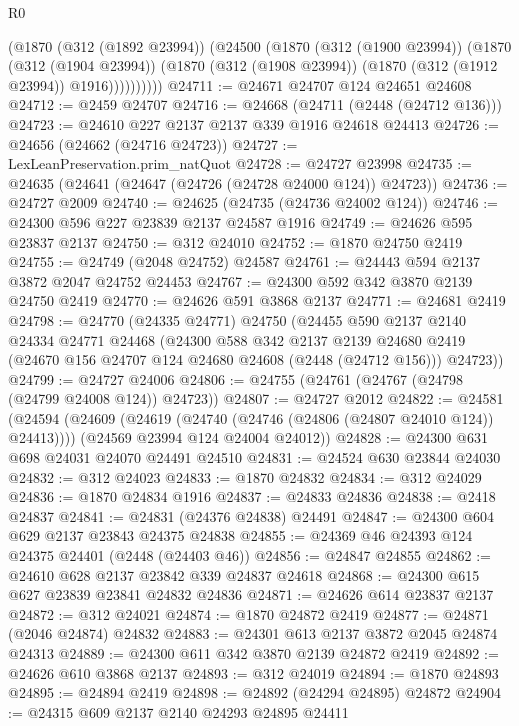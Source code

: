 \begin{lexlean}{R0}
\begin{coremodule}
            (@1870
              (@312 (@1892 @23994))
              (@24500
                (@1870
                  (@312 (@1900 @23994))
                  (@1870
                    (@312 (@1904 @23994))
                    (@1870 (@312 (@1908 @23994)) (@1870 (@312 (@1912 @23994)) @1916))))))))))
@24711 := @24671 @24707 @124 @24651 @24608
@24712 := @2459 @24707
@24716 := @24668 (@24711 (@2448 (@24712 @136)))
@24723 := @24610 @227 @2137 @2137 @339 @1916 @24618 @24413
@24726 := @24656 (@24662 (@24716 @24723))
@24727 := LexLeanPreservation.prim_natQuot
@24728 := @24727 @23998
@24735 := @24635 (@24641 (@24647 (@24726 (@24728 @24000 @124)) @24723))
@24736 := @24727 @2009
@24740 := @24625 (@24735 (@24736 @24002 @124))
@24746 := @24300 @596 @227 @23839 @2137 @24587 @1916
@24749 := @24626 @595 @23837 @2137
@24750 := @312 @24010
@24752 := @1870 @24750 @2419
@24755 := @24749 (@2048 @24752) @24587
@24761 := @24443 @594 @2137 @3872 @2047 @24752 @24453
@24767 := @24300 @592 @342 @3870 @2139 @24750 @2419
@24770 := @24626 @591 @3868 @2137
@24771 := @24681 @2419
@24798 := @24770
    (@24335 @24771)
    @24750
    (@24455
      @590
      @2137
      @2140
      @24334
      @24771
      @24468
      (@24300
        @588
        @342
        @2137
        @2139
        @24680
        @2419
        (@24670 @156 @24707 @124 @24680 @24608 (@2448 (@24712 @156)))
        @24723))
@24799 := @24727 @24006
@24806 := @24755 (@24761 (@24767 (@24798 (@24799 @24008 @124)) @24723))
@24807 := @24727 @2012
@24822 := @24581
    (@24594
      (@24609 (@24619 (@24740 (@24746 (@24806 (@24807 @24010 @124)) @24413))))
      (@24569 @23994 @124 @24004 @24012))
@24828 := @24300 @631 @698 @24031 @24070 @24491 @24510
@24831 := @24524 @630 @23844 @24030
@24832 := @312 @24023
@24833 := @1870 @24832
@24834 := @312 @24029
@24836 := @1870 @24834 @1916
@24837 := @24833 @24836
@24838 := @2418 @24837
@24841 := @24831 (@24376 @24838) @24491
@24847 := @24300 @604 @629 @2137 @23843 @24375 @24838
@24855 := @24369 @46 @24393 @124 @24375 @24401 (@2448 (@24403 @46))
@24856 := @24847 @24855
@24862 := @24610 @628 @2137 @23842 @339 @24837 @24618
@24868 := @24300 @615 @627 @23839 @23841 @24832 @24836
@24871 := @24626 @614 @23837 @2137
@24872 := @312 @24021
@24874 := @1870 @24872 @2419
@24877 := @24871 (@2046 @24874) @24832
@24883 := @24301 @613 @2137 @3872 @2045 @24874 @24313
@24889 := @24300 @611 @342 @3870 @2139 @24872 @2419
@24892 := @24626 @610 @3868 @2137
@24893 := @312 @24019
@24894 := @1870 @24893
@24895 := @24894 @2419
@24898 := @24892 (@24294 @24895) @24872
@24904 := @24315 @609 @2137 @2140 @24293 @24895 @24411

\end{coremodule}
\end{lexlean}
